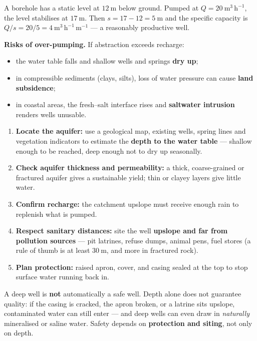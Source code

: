\documentclass[11pt]{article}
\begin{document}
\begin{exemplebox}
A borehole has a static level at $12\ \mathrm{m}$ below ground. Pumped at $Q = 20\ \mathrm{m^3\,h^{-1}}$, the level stabilises at $17\ \mathrm{m}$. Then $s = 17 - 12 = 5\ \mathrm{m}$ and the specific capacity is $Q/s = 20/5 = 4\ \mathrm{m^3\,h^{-1}\,m^{-1}}$ — a reasonably productive well.
\end{exemplebox}

\textbf{Risks of over-pumping.} If abstraction exceeds recharge:
\begin{itemize}
\item the water table falls and shallow wells and springs \textbf{dry up};
\item in compressible sediments (clays, silts), loss of water pressure can cause \textbf{land subsidence};
\item in coastal areas, the fresh–salt interface rises and \textbf{saltwater intrusion} renders wells unusable.
\end{itemize}

\begin{methode}
\begin{enumerate}
\item \textbf{Locate the aquifer:} use a geological map, existing wells, spring lines and vegetation indicators to estimate the \textbf{depth to the water table} — shallow enough to be reached, deep enough not to dry up seasonally.
\item \textbf{Check aquifer thickness and permeability:} a thick, coarse-grained or fractured aquifer gives a sustainable yield; thin or clayey layers give little water.
\item \textbf{Confirm recharge:} the catchment upslope must receive enough rain to replenish what is pumped.
\item \textbf{Respect sanitary distances:} site the well \textbf{upslope and far from pollution sources} — pit latrines, refuse dumps, animal pens, fuel stores (a rule of thumb is at least $30\ \mathrm{m}$, and more in fractured rock).
\item \textbf{Plan protection:} raised apron, cover, and casing sealed at the top to stop surface water running back in.
\end{enumerate}
\end{methode}

\begin{attention}
A deep well is \textbf{not} automatically a safe well. Depth alone does not guarantee quality: if the casing is cracked, the apron broken, or a latrine sits upslope, contaminated water can still enter — and deep wells can even draw in \emph{naturally} mineralised or saline water. Safety depends on \textbf{protection and siting}, not only on depth.
\end{attention}
\end{document}
